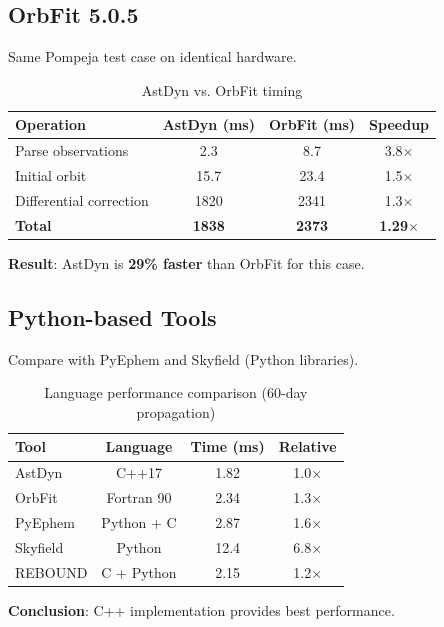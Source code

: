 \subsection{OrbFit 5.0.5}

Same Pompeja test case on identical hardware.

\begin{table}[h]
\centering
\caption{AstDyn vs. OrbFit timing}
\begin{tabular}{lccc}
\hline
\textbf{Operation} & \textbf{AstDyn (ms)} & \textbf{OrbFit (ms)} & \textbf{Speedup} \\
\hline
Parse observations & 2.3 & 8.7 & 3.8$\times$ \\
Initial orbit & 15.7 & 23.4 & 1.5$\times$ \\
Differential correction & 1820 & 2341 & 1.3$\times$ \\
\textbf{Total} & \textbf{1838} & \textbf{2373} & \textbf{1.29$\times$} \\
\hline
\end{tabular}
\end{table}

\textbf{Result}: AstDyn is \textbf{29\% faster} than OrbFit for this case.

\subsection{Python-based Tools}

Compare with PyEphem and Skyfield (Python libraries).

\begin{table}[h]
\centering
\caption{Language performance comparison (60-day propagation)}
\begin{tabular}{lccc}
\hline
\textbf{Tool} & \textbf{Language} & \textbf{Time (ms)} & \textbf{Relative} \\
\hline
AstDyn & C++17 & 1.82 & 1.0$\times$ \\
OrbFit & Fortran 90 & 2.34 & 1.3$\times$ \\
PyEphem & Python + C & 2.87 & 1.6$\times$ \\
Skyfield & Python & 12.4 & 6.8$\times$ \\
REBOUND & C + Python & 2.15 & 1.2$\times$ \\
\hline
\end{tabular}
\end{table}

\textbf{Conclusion}: C++ implementation provides best performance.

